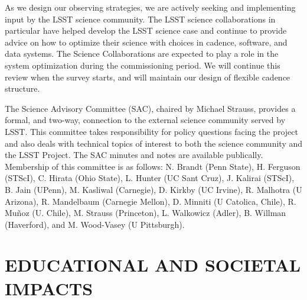 \documentclass{emulateapj}
\begin{document}
As we design our observing strategies, we are actively seeking and implementing
input by the LSST science community.  The LSST science collaborations
in particular have helped develop the LSST science case and continue
to provide advice on how to optimize their science with choices in
cadence, software,  
and data systems. The Science Collaborations are expected to play a
role  
in the system optimization during the commissioning period. We will continue 
this review when the survey starts, and will maintain our design of flexible 
cadence structure.

The Science Advisory Committee (SAC), chaired by Michael Strauss, provides a formal, and 
two-way, connection to the external science community served by LSST. This committee takes 
responsibility for policy questions facing the project and also deals with technical topics of interest 
to both the science community and the LSST Project. The SAC minutes and notes are available 
publically. Membership of this committee is as follows: N. Brandt
(Penn State), H. Ferguson (STScI), 
C. Hirata (Ohio State), L. Hunter (UC Sant Cruz), J. Kalirai (STScI), B. Jain (UPenn), M. Kasliwal (Carnegie), 
D. Kirkby (UC Irvine), R. Malhotra (U Arizona), R. Mandelbaum
(Carnegie Mellon),
D. Minniti (U Catolica, Chile), R. Mu\~noz (U. Chile), 
M. Strauss (Princeton), L. Walkowicz (Adler), B. Willman (Haverford), and M. Wood-Vasey 
(U Pittsburgh). 



\section{   EDUCATIONAL AND SOCIETAL IMPACTS    }
\label{Sec:impact}
\end{document}
